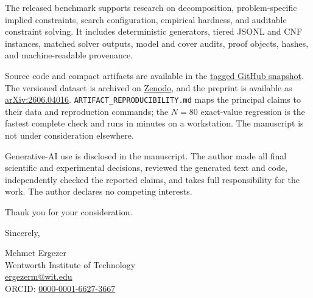 \documentclass[10pt]{article}
\begin{document}
The released benchmark supports research on decomposition, problem-specific
implied constraints, search configuration, empirical hardness, and auditable
constraint solving. It includes deterministic generators, tiered JSONL and
CNF instances, matched solver outputs, model and cover audits, proof objects,
hashes, and machine-readable provenance.

Source code and compact artifacts are available in the
\href{https://github.com/memoatwit/erdos_1194/tree/constraints-submission-v1.5/erdos_r3}{tagged GitHub snapshot}.
The versioned dataset is archived on
\href{https://doi.org/10.5281/zenodo.21413746}{Zenodo}, and the preprint is
available as \href{https://arxiv.org/abs/2606.04016}{arXiv:2606.04016}.
\texttt{ARTIFACT\_REPRODUCIBILITY.md} maps the principal
claims to their data and reproduction commands; the $N=80$ exact-value
regression is the fastest complete check and runs in minutes on a workstation.
The manuscript is not under consideration elsewhere.

Generative-AI use is disclosed in the manuscript. The author made all final
scientific and experimental decisions, reviewed the generated text and code,
independently checked the reported claims, and takes full responsibility for
the work. The author declares no competing interests.

Thank you for your consideration.

Sincerely,

\vspace{0.5em}
Mehmet Ergezer\\
Wentworth Institute of Technology\\
\href{mailto:ergezerm@wit.edu}{ergezerm@wit.edu}\\
ORCID: \href{https://orcid.org/0000-0001-6627-3667}{0000-0001-6627-3667}
\end{document}

